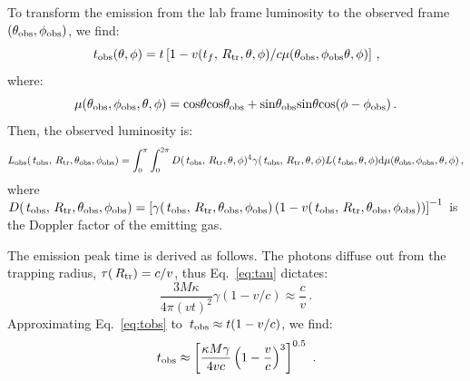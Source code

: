 \documentclass[twocolumn,dvipsnames]{aastex62}
\newcommand{\rtr}{\,{R_{\rm tr}}}
\newcommand{\tobs}{\,{t_{\rm obs}}}
\begin{document}
To transform the emission from the lab frame luminosity to the observed frame $(\theta_{\rm obs},\phi_{\rm obs})$, we find: 
\begin{equation}\label{eq:tobs}
\tobs(\theta,\phi) = t\left[1-v(t_f,\rtr,\theta,\phi)/c\mu(\theta_{\rm obs},\phi_{\rm obs}\theta,\phi)\right]\,,
\end{equation}
where:
\begin{equation}
    \mu(\theta_{\rm obs},\phi_{\rm obs},\theta,\phi) = {\rm cos}\theta{\rm cos}\theta_{\rm obs}+{\rm sin}\theta_{\rm obs}{\rm sin}\theta{\rm cos}({\phi-\phi_{\rm obs}})\,.
\end{equation}
Then, the observed luminosity is:
\begin{equation}
    L_{\rm obs}(\tobs,\rtr,\theta_{\rm obs},\phi_{\rm obs}) = \int_0^\pi\int_0^{2\pi}D(\tobs,\rtr,\theta,\phi)^4\gamma(\tobs,\rtr,\theta,\phi)L(\tobs,\theta,\phi)\mathrm{d}\mu(\theta_{\rm obs},\phi_{\rm obs},\theta,\phi)\,,
\end{equation}
where $ D(\tobs,\rtr,\theta_{\rm obs},\phi_{\rm obs}) = \left[\gamma(\tobs,\rtr,\theta_{\rm obs},\phi_{\rm obs})\left(1-v(\tobs,\rtr,\theta_{\rm obs},\phi_{\rm obs})\right)\right]^{-1}$ is the Doppler factor of the emitting gas.

The emission peak time is derived as follows. The photons diffuse out from the trapping radius, $ \tau(\rtr) = c/v $, thus Eq.~\eqref{eq:tau} dictates:
\begin{equation}
    \frac{3M\kappa}{4\pi(vt)^2}\gamma(1-v/c) \approx \frac{c}{v}\,.
\end{equation}
Approximating Eq.~\eqref{eq:tobs} to $ \tobs \approx t(1-v/c) $, we find:
\begin{equation}\label{eq:tpeak}
    \tobs \approx \left[\frac{\kappa M \gamma}{4 v c}\left(1-\frac{v}{c}\right)^3\right]^{0.5}~.
\end{equation}
\end{document}
